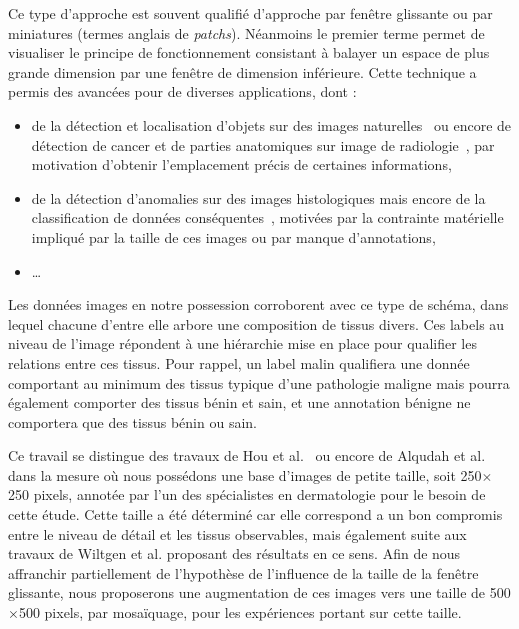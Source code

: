 Ce type d'approche est souvent qualifié d'approche par fenêtre glissante ou par miniatures (termes anglais de \textit{patchs}). Néanmoins le premier terme permet de visualiser le principe de fonctionnement consistant à balayer un espace de plus grande dimension par une fenêtre de dimension inférieure. Cette technique a permis des avancées pour de diverses applications, dont : 
\begin{itemize}
    \item de la détection et localisation d'objets sur des images naturelles~\cite{Harzallah2009} ou encore de détection de cancer et de parties anatomiques sur image de radiologie~\cite{Helwan2017}, par motivation d'obtenir l'emplacement précis de certaines informations,
    \item de la détection d'anomalies sur des images histologiques mais encore de la classification de données conséquentes~\cite{Hou2016,Alqudah2019,Wei2019}, motivées par la contrainte matérielle impliqué par la taille de ces images ou par manque d'annotations,
    \item \ldots
\end{itemize}\par

Les données images en notre possession corroborent avec ce type de schéma, dans lequel chacune d'entre elle arbore une composition de tissus divers. Ces labels au niveau de l'image répondent à une hiérarchie mise en place pour qualifier les relations entre ces tissus. Pour rappel, un label malin qualifiera une donnée comportant au minimum des tissus typique d'une pathologie maligne mais pourra également comporter des tissus bénin et sain, et une annotation bénigne ne comportera que des tissus bénin ou sain.\par

Ce travail se distingue des travaux de Hou et al.~\cite{Hou2016} ou encore de Alqudah et al.~\cite{Alqudah2019} dans la mesure où nous possédons une base d'images de petite taille, soit 250$\times$250 pixels, annotée par l'un des spécialistes en dermatologie pour le besoin de cette étude. Cette taille a été déterminé car elle correspond a un bon compromis entre le niveau de détail et les tissus observables, mais également suite aux travaux de Wiltgen et al.\cite{Wiltgen2008} proposant des résultats en ce sens. Afin de nous affranchir partiellement de l'hypothèse de l'influence de la taille de la fenêtre glissante, nous proposerons une augmentation de ces images vers une taille de 500$\times$500 pixels, par mosaïquage, pour les expériences portant sur cette taille.\par

